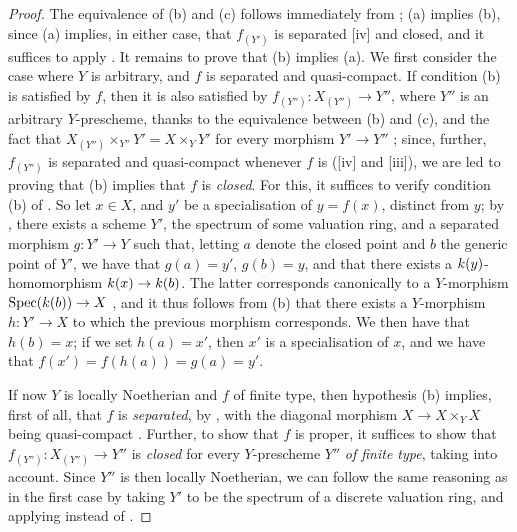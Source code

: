 \begin{proof}
\label{proof-II.7.3.8}
The equivalence of (b) and (c) follows immediately from ;
(a) implies (b), since (a) implies, in either case, that $f_(Y')$ is separated [iv] and closed, and it suffices to apply .
It remains to prove that (b) implies (a).
We first consider the case where $Y$ is arbitrary, and $f$ is separated and quasi-compact.
If condition (b) is satisfied by $f$, then it is also satisfied by $f_{(Y'')}:X_{(Y'')}\to Y''$, where $Y''$ is an arbitrary $Y$-prescheme, thanks to the equivalence between (b) and (c), and the fact that $X_{(Y'')}\times_{Y''}Y' = X\times_Y Y'$ for every morphism $Y'\to Y''$ ;
since, further, $f_{(Y'')}$ is separated and quasi-compact whenever $f$ is ([iv] and [iii]), we are led to proving that (b) implies that $f$ is \emph{closed}.
For this, it suffices to verify condition (b) of .
So let $x\in X$, and $y'$ be a specialisation of $y=f(x)$, distinct from $y$;
by , there exists a scheme $Y'$, the spectrum of some valuation ring, and a separated morphism $g:Y'\to Y$ such that, letting $a$ denote the closed point and $b$ the generic point of $Y'$, we have that $g(a)=y'$, $g(b)=y$, and that there exists a $k(y)$-homomorphism $\kres(x)\to\kres(b)$.
The latter corresponds canonically to a $Y$-morphism $\Spec(\kres(b))\to X$ , and it thus follows from (b) that there exists a $Y$-morphism $h:Y'\to X$ to which the previous morphism corresponds.
We then have that $h(b)=x$;
if we set $h(a)=x'$, then $x'$ is a specialisation of $x$, and we have that $f(x')=f(h(a))=g(a)=y'$.

If now $Y$ is locally Noetherian and $f$ of finite type, then hypothesis (b) implies, first of all, that $f$ is \emph{separated}, by , with the diagonal morphism $X\to X\times_Y X$ being quasi-compact .
Further, to show that $f$ is proper, it suffices to show that $f_{(Y'')}:X_{(Y'')}\to Y''$ is \emph{closed} for every $Y$-prescheme $Y''$ \emph{of finite type}, taking  into account.
Since $Y''$ is then locally Noetherian, we can follow the same reasoning as in the first case by taking $Y'$ to be the spectrum of a discrete valuation ring, and applying  instead of .
\end{proof}

